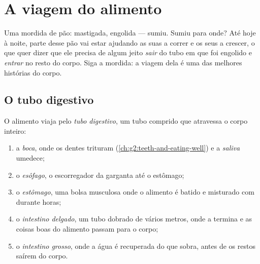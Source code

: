 \chapter{A viagem do alimento}\label{ch:g4:journey-of-food}

Uma mordida de pão: mastigada, engolida --- sumiu. Sumiu para onde?
Até hoje à noite, parte desse pão vai estar ajudando as suas 
a correr e os seus  a crescer, o que quer dizer que ele precisa
de algum jeito \emph{sair} do tubo em que foi engolido e \emph{entrar}
no resto do corpo. Siga a mordida: a viagem dela é uma das melhores
histórias do corpo.

\section{O tubo digestivo}

\begin{definition}\label{def:g4:journey-of-food:tract}
O alimento viaja pelo \emph{tubo digestivo},
um tubo comprido que atravessa o corpo inteiro:
\begin{enumerate}
  \item a \emph{boca}, onde os dentes trituram
        (\cref{ch:g2:teeth-and-eating-well}) e a
        \emph{saliva} umedece;
  \item o \emph{esôfago}, o escorregador da garganta
        até o estômago;
  \item o \emph{estômago}, uma bolsa musculosa onde
        o alimento é batido e misturado com  durante
        horas;
  \item o \emph{intestino delgado}, um tubo
        dobrado de vários metros, onde a  termina e as coisas
        boas do alimento passam para o corpo;
  \item o \emph{intestino grosso}, onde a
        água é recuperada do que sobra, antes de os restos saírem do
        corpo.
\end{enumerate}
\end{definition}

